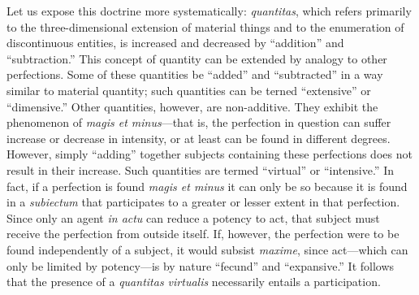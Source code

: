 Let us expose this doctrine more systematically: \emph{quantitas}, which refers primarily to the three-dimensional extension of material things and to the enumeration of discontinuous entities, is increased and decreased by ``addition'' and ``subtraction.'' This concept of quantity can be extended by analogy to other perfections. Some of these quantities be ``added'' and ``subtracted'' in a way similar to material quantity; such quantities can be terned ``extensive'' or ``dimensive.'' Other quantities, however, are non-additive. They exhibit the phenomenon of \emph{magis et minus}---that is, the perfection in question can suffer increase or decrease in intensity, or at least can be found in different degrees. However, simply ``adding'' together subjects containing these perfections does not result in their increase. Such quantities are termed ``virtual'' or ``intensive.'' In fact, if a perfection is found \emph{magis et minus} it can only be so because it is found in a \emph{subiectum} that participates to a greater or lesser extent in that perfection. Since only an agent \emph{in actu} can reduce a potency to act, that subject must receive the perfection from outside itself. If, however, the perfection were to be found independently of a subject, it would subsist \emph{maxime}, since act---which can only be limited by potency---is by nature ``fecund'' and ``expansive.''  It follows that the presence of a \emph{quantitas virtualis} necessarily entails a participation.

